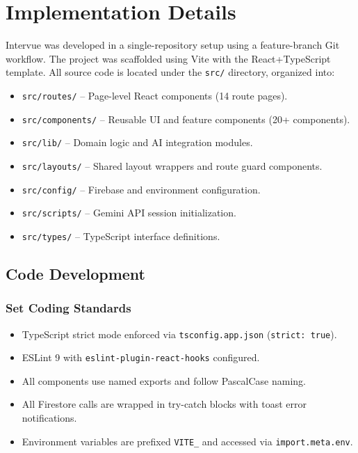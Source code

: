 \documentclass{fisatprojectfinal}
\begin{document}
\section{Implementation Details}
Intervue was developed in a single-repository setup using a feature-branch Git workflow.
The project was scaffolded using Vite with the React+TypeScript template. All source code is
located under the \texttt{src/} directory, organized into:
\begin{itemize}
  \item \texttt{src/routes/} -- Page-level React components (14 route pages).
  \item \texttt{src/components/} -- Reusable UI and feature components (20+ components).
  \item \texttt{src/lib/} -- Domain logic and AI integration modules.
  \item \texttt{src/layouts/} -- Shared layout wrappers and route guard components.
  \item \texttt{src/config/} -- Firebase and environment configuration.
  \item \texttt{src/scripts/} -- Gemini API session initialization.
  \item \texttt{src/types/} -- TypeScript interface definitions.
\end{itemize}

\subsection{Code Development}
\subsubsection{Set Coding Standards}
\begin{itemize}
  \item TypeScript strict mode enforced via \texttt{tsconfig.app.json}
        (\texttt{strict: true}).
  \item ESLint 9 with \texttt{eslint-plugin-react-hooks} configured.
  \item All components use named exports and follow PascalCase naming.
  \item All Firestore calls are wrapped in try-catch blocks with toast error notifications.
  \item Environment variables are prefixed \texttt{VITE\_} and accessed via
        \texttt{import.meta.env}.
\end{itemize}
\end{document}
